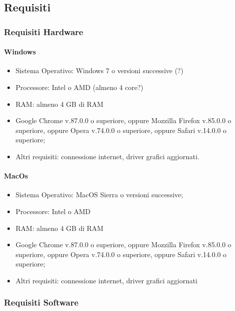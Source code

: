 \documentclass[../manuale_utente.tex]{subfiles}
\begin{document}
\subsection{Requisiti}
    \label{sec:requisiti}
\subsubsection{Requisiti Hardware}
    \label{subsub:req_h}

\paragraph{Windows}
    \label{par:Windows_req}

\begin{itemize}
    \item Sistema Operativo: Windows 7 o versioni successive (?)
    \item Processore: Intel o AMD (almeno 4 core?)
    \item RAM: almeno 4 GB di RAM
    \item Google Chrome v.87.0.0 o superiore, oppure Mozzilla Firefox v.85.0.0 o superiore, oppure Opera v.74.0.0 o superiore, oppure Safari v.14.0.0 o superiore;
    \item Altri requisiti: connessione internet, driver grafici aggiornati.
\end{itemize}

\paragraph{MacOs}
    \label{par:mac_req}

\begin{itemize}
    \item Sistema Operativo: MacOS Sierra o versioni successive;
    \item Processore: Intel o AMD
    \item RAM: almeno 4 GB di RAM
    \item Google Chrome v.87.0.0 o superiore, oppure Mozzilla Firefox v.85.0.0 o superiore, oppure Opera v.74.0.0 o superiore, oppure Safari v.14.0.0 o superiore;
    \item Altri requisiti: connessione internet, driver grafici aggiornati
\end{itemize}

\subsubsection{Requisiti Software}
    \label{subsub:req_s}
\end{document}
